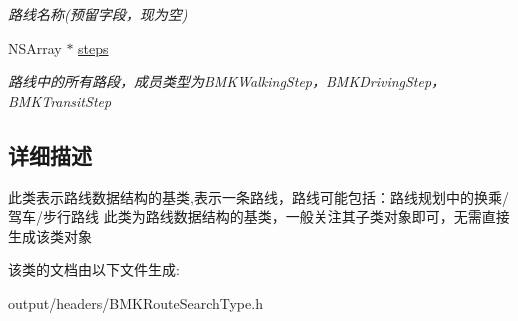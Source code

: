\begin{DoxyCompactItemize}
\begin{DoxyCompactList}\small\item\em 路线名称(预留字段，现为空) \end{DoxyCompactList}\item 
\hypertarget{interface_b_m_k_route_line_a181c231815114b03dfc858ac26a0168a}{}N\+S\+Array $\ast$ \hyperlink{interface_b_m_k_route_line_a181c231815114b03dfc858ac26a0168a}{steps}\label{interface_b_m_k_route_line_a181c231815114b03dfc858ac26a0168a}

\begin{DoxyCompactList}\small\item\em 路线中的所有路段，成员类型为\+B\+M\+K\+Walking\+Step，\+B\+M\+K\+Driving\+Step，\+B\+M\+K\+Transit\+Step \end{DoxyCompactList}\end{DoxyCompactItemize}


\subsection{详细描述}
此类表示路线数据结构的基类,表示一条路线，路线可能包括：路线规划中的换乘/驾车/步行路线 此类为路线数据结构的基类，一般关注其子类对象即可，无需直接生成该类对象 

该类的文档由以下文件生成\+:\begin{DoxyCompactItemize}
\item 
output/headers/B\+M\+K\+Route\+Search\+Type.\+h\end{DoxyCompactItemize}
